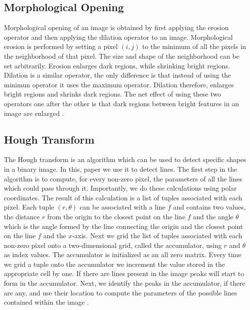 \documentclass{article}
\begin{document}
\subsection{Morphological Opening}
Morphological opening of an image is obtained by first applying the erosion operator and then applying the dilation operator to an image. 
Morphological erosion is performed by setting a pixel $(i,j)$ to the minimum of all the pixels in the neighborhood of that pixel. The size 
and shape of the neighborhood can be set arbitrarily. Erosion enlarges dark regions, while shrinking bright regions. Dilation is a similar operator,
the only difference is that instead of using the minimun operator it uses the maximum operator. Dilation therefore, enlarges bright regions and shrinks dark regions.
The net effect of using these two operators one after the other is that dark regions between bright features in an image are enlarged \cite{soille2013}. 

\subsection{Hough Transform}
The Hough transform is an algorithm which can be used to detect specific shapes in a binary image. In this, paper we use it to detect lines. 
The first step in the algorithm is to compute, for every non-zero pixel, the parameters of all the lines which could pass through it. Importantly, we do these calculations using polar coordinates. 
The result of this calculation is a list of tuples associated with each pixel. Each tuple $(r,\theta)$ can be associated with a line $f$ and contains two values, 
the distance $r$ from the origin to the closest point on the line $f$ and the angle $\theta$ which is the angle formed by the line 
connecting the origin and the closest point on the line $f$ and the $x$-axis. Next we grid the list of tuples associated with each non-zero pixel onto a two-dimensional 
grid, called the accumulator, using $r$ and $\theta$ as index values. The accumulator is initialized as an all zero matrix. Every time we grid a tuple onto the accumulator 
we increment the value stored in the appropriate cell by one. If there are lines present in the image peaks will start to form in the accumulator. Next, we 
identify the peaks in the accumulator, if there are any, and use their location to compute the parameters of the possible lines contained within the image \cite{illingworth1988}. 
\end{document}
